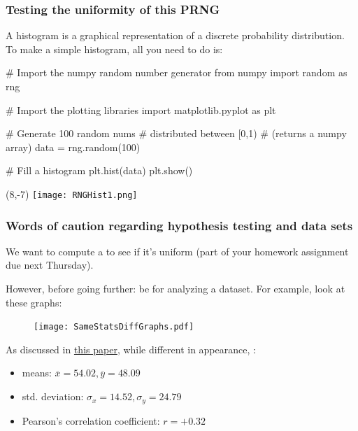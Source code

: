 \documentclass[hyperref={colorlinks=true}]{beamer}
\begin{document}

\begin{frame}[fragile]%
  \frametitle{Testing the uniformity of this PRNG}
  
  A histogram is a graphical representation of a discrete probability distribution. To make a simple histogram, all you need to do is:
  
  \begin{ucpythonblock}{}
# Import the numpy random number generator
from numpy import random as rng

# Import the plotting libraries
import matplotlib.pyplot as plt

# Generate 100 random nums 
# distributed between [0,1)
# (returns a numpy array)
data = rng.random(100) 
 
# Fill a histogram 
plt.hist(data)  
plt.show()
  \end{ucpythonblock}
  
  \pause

  \begin{textblock}{12}(8,-7)
    \texttt{[image: RNGHist1.png]}
  \end{textblock}  


\end{frame}


\begin{frame}[fragile]%
  \frametitle{Words of caution regarding hypothesis testing and data sets}
  
  We want to compute a \chisq to see if it's uniform (part of your homework assignment due next Thursday).
  
  However, before going further: be  for analyzing a dataset. For example, look at these graphs:
  
  \begin{figure}
    \texttt{[image: SameStatsDiffGraphs.pdf]}
  \end{figure} 
  
  \pause
  
  As discussed in \href{https://www.autodeskresearch.com/publications/samestats}{this paper}, while different in appearance, :
  
  \begin{itemize}
    \item means: $\overline{x}=54.02, \overline{y}=48.09$
    \item std. deviation: $\sigma_x = 14.52, \sigma_y = 24.79$
    \item Pearson's correlation coefficient: $r = +0.32$
  \end{itemize}


\end{frame}
\end{document}
